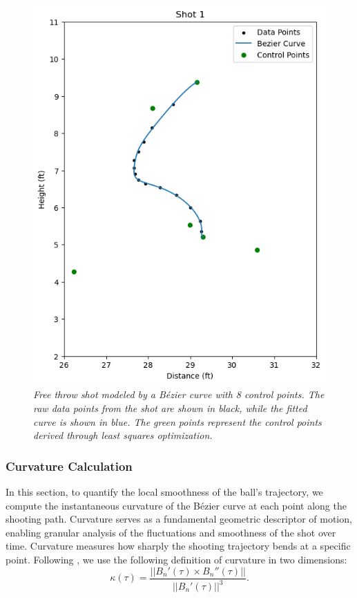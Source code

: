 \documentclass{article}
\begin{document}
            \begin{figure}[H]
                \centering
                \includegraphics[scale=0.4]{shot1.png}
                \caption{\it Free throw shot modeled by a Bézier curve with 8 control points. The raw data points from the shot are shown in black, while the fitted curve is shown in blue. The green points represent the control points derived through least squares optimization.}
                \label{fig:free-throw-bezier}
            \end{figure}

        \subsubsection{Curvature Calculation}

          In this section, to quantify the local smoothness of the ball’s trajectory, we compute the instantaneous curvature of the Bézier curve at each point along the shooting path. Curvature serves as a fundamental geometric descriptor of motion, enabling granular analysis of the fluctuations and smoothness of the shot over time. Curvature measures how sharply the shooting trajectory bends at a specific point. Following \citet{slegers_role_2024}, we use the following definition of curvature in two dimensions:
          \[
            \kappa(\tau) = \frac{||B_n'(\tau) \times B_n''(\tau)||}{||B_n'(\tau)||^3}.
          \]
          
\end{document}
